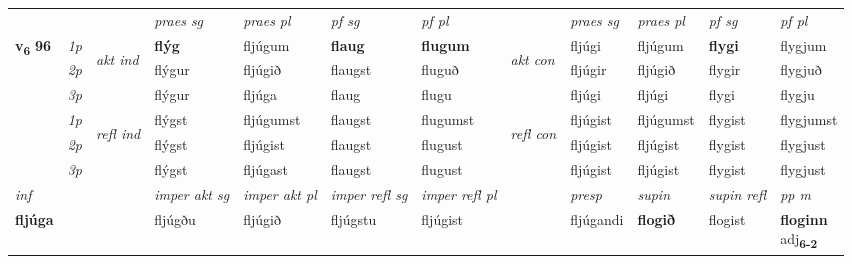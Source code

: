 \begin{longtable}[l]{X>{\footnotesize\itshape}llXXXXlXXXX}
 & &   & \textit{praes sg}  & \textit{praes pl}    & \textit{ pf sg} & \textit{pf pl} & & \textit{praes sg}  & \textit{praes pl}    & \textit{pf sg} & \textit{pf pl }  \\ \cmidrule{4-7} \cmidrule{9-12}
 \multirow{2}{*}{{{\textbf{v{\textsubscript{6}}} \Large{\textbf{96}}}}}  & 1p & \multirow{3}{*}{\begin{turn}{90}\textit{akt ind}\end{turn}} & \textbf{flýg} & fljúgum & \textbf{flaug} & \textbf{flugum} & \multirow{3}{*}{\begin{turn}{90}\textit{akt con}\end{turn}} &fljúgi & fljúgum & \textbf{flygi} & flygjum\\*
 & 2p &  &  flýgur  & fljúgið & flaugst & fluguð & & fljúgir & fljúgið & flygir & flygjuð \\*
 & 3p &  & flýgur & fljúga & flaug & flugu & & fljúgi & fljúgi& flygi & flygju \\*
\cmidrule{4-7} \cmidrule{9-12}
 & 1p & \multirow{3}{*}{\begin{turn}{90}\textit{refl ind}\end{turn}}  & flýgst & fljúgumst & flaugst & flugumst & \multirow{3}{*}{\begin{turn}{90}\textit{refl con}\end{turn}}  &fljúgist & fljúgumst & flygist & flygjumst \\*
 & 2p &  & flýgst & fljúgist & flaugst & flugust & &fljúgist & fljúgist & flygist & flygjust \\*
 & 3p  & & flýgst & fljúgast & flaugst & flugust & & fljúgist & fljúgist& flygist & flygjust \\*
\cmidrule{4-7} \cmidrule{9-12}

   {\textit{inf}} & &  & \textit{imper akt sg} & \textit{imper akt pl} & \textit{imper refl sg} & \textit{imper refl pl} && \textit{presp} & \textit{supin} & \textit{supin refl} & \textit{pp m} \\*
  {\textbf{fljúga}} & && fljúgðu  & fljúgið & fljúgstu & fljúgist && fljúgandi &  \textbf{flogið} & flogist & \specialcell{\textbf{floginn} \\ adj\textbf{\textsubscript{6-2}}} \\*

\midrule


\end{longtable}
